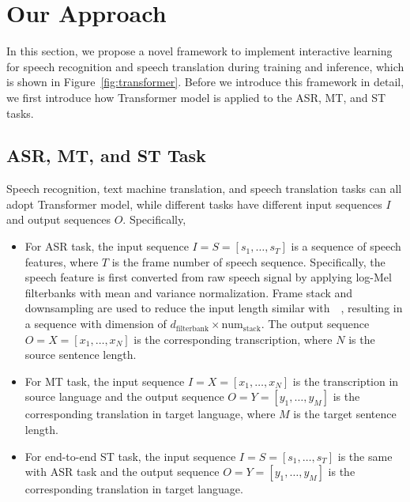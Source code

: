 \documentclass[letterpaper]{article} %
\begin{document}
\section{Our Approach}
In this section, we propose a novel framework to implement interactive learning for speech recognition and speech translation during training and inference, which is shown in Figure~\ref{fig:transformer}. Before we introduce this framework in detail, we first introduce how Transformer model is applied to the ASR, MT, and ST tasks.

\subsection{ASR, MT, and ST Task}
Speech recognition, text machine translation, and speech translation tasks can all adopt Transformer model, while different tasks have different input sequences $\mathbf{\mathit{I}}$ and output sequences $\mathbf{\mathit{O}}$. Specifically,
\begin{itemize}
	\item For ASR task, the input sequence $\mathbf{\mathit{I}}=\mathbf{\mathit{S}}=[s_1,\dots,s_T]$ is a sequence of speech features, where $T$ is the frame number of speech sequence. Specifically, the speech feature is first converted from raw speech signal by applying log-Mel filterbanks with mean and variance normalization. Frame stack and downsampling are used  to reduce the input length similar with~\citeauthor{sak2015fast}~, resulting in a sequence with dimension of $d_{\textrm{filterbank}} \times \textrm{num}_{\textrm{stack}}$.
	The output sequence $\mathbf{\mathit{O}}=\mathbf{\mathit{X}}=[x_1,\dots,x_N]$ is the corresponding transcription, where $N$ is the source sentence length.
	\item For  MT task, the input sequence $\mathbf{\mathit{I}}=\mathbf{\mathit{X}}=[x_1,\dots,x_N]$ is  the transcription in source language and the output sequence $\mathbf{\mathit{O}}=\mathbf{\mathit{Y}}=[y_1,\dots,y_M]$ is the corresponding translation in target language, where $M$ is the target sentence length.
	\item For end-to-end ST task, the input sequence $\mathbf{\mathit{I}}=\mathbf{\mathit{S}}=[s_1,\dots,s_T]$ is the same with ASR task and the output sequence $\mathbf{\mathit{O}}=\mathbf{\mathit{Y}}=[y_1,\dots,y_M]$ is the corresponding translation in target language.
\end{itemize}
\end{document}
